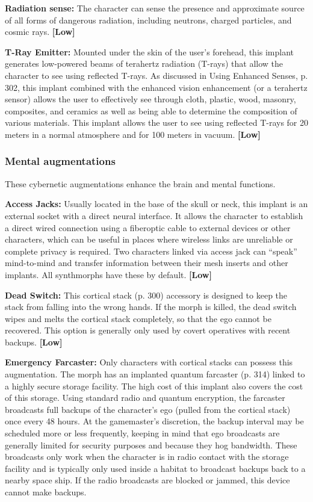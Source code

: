 \textbf{Radiation sense:} The character can sense the presence and approximate source of all forms of dangerous radiation, including neutrons, charged particles, and cosmic rays. \textbf{[Low]}

\textbf{T-Ray Emitter:} Mounted under the skin of the user’s forehead, this implant generates low-powered beams of terahertz radiation (T-rays) that allow the character to see using reflected T-rays. As discussed in Using Enhanced Senses, p. 302, this implant combined with the enhanced vision enhancement (or a terahertz sensor) allows the user to effectively see through cloth, plastic, wood, masonry, composites, and ceramics as well as being able to determine the composition of various materials. This implant allows the user to see using reflected T-rays for 20 meters in a normal atmosphere and for 100 meters in vacuum. \textbf{[Low]}

\subsubsection{Mental augmentations}

These cybernetic augmentations enhance the brain and mental functions.

\textbf{Access Jacks:} Usually located in the base of the skull or neck, this implant is an external socket with a direct neural interface. It allows the character to establish a direct wired connection using a fiberoptic cable to external devices or other characters, which can be useful in places where wireless links are unreliable or complete privacy is required. Two characters linked via access jack can ``speak'' mind-to-mind and transfer information between their mesh inserts and other implants. All synthmorphs have these by default. \textbf{[Low]}

\textbf{Dead Switch:} This cortical stack (p. 300) accessory is designed to keep the stack from falling into the wrong hands. If the morph is killed, the dead switch wipes and melts the cortical stack completely, so that the ego cannot be recovered. This option is generally only used by covert operatives with recent backups. \textbf{[Low]}

\textbf{Emergency Farcaster:} Only characters with cortical stacks can possess this augmentation. The morph has an implanted quantum farcaster (p. 314) linked to a highly secure storage facility. The high cost of this implant also covers the cost of this storage. Using standard radio and quantum encryption, the farcaster broadcasts full backups of the character’s ego (pulled from the cortical stack) once every 48 hours. At the gamemaster’s discretion, the backup interval may be scheduled more or less frequently, keeping in mind that ego broadcasts are generally limited for security purposes and because they hog bandwidth. These broadcasts only work when the character is in radio contact with the storage facility and is typically only used inside a habitat to broadcast backups back to a nearby space ship. If the radio broadcasts are blocked or jammed, this device cannot make backups.

